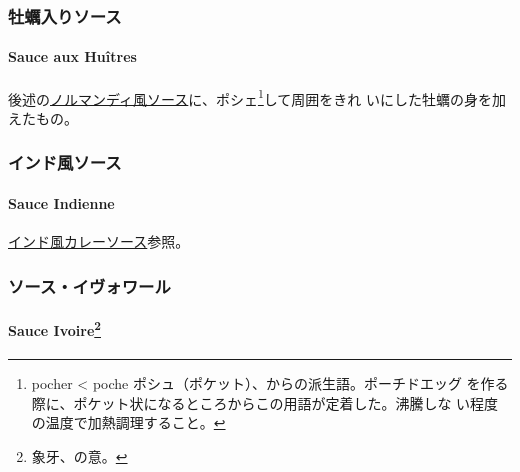 \begin{recette}
{\subsubsection{牡蠣入りソース}\label{ux7261ux8823ux5165ux308aux30bdux30fcux30b9}}

\hypertarget{sauce-aux-huitres}{%
\paragraph{Sauce aux Huîtres}\label{sauce-aux-huitres}}


後述の\protect\hyperlink{sauce-normande}{ノルマンディ風ソース}に、ポシェ\footnote{pocher
  \textless{} poche ポシュ（ポケット）、からの派生語。ポーチドエッグ
  を作る際に、ポケット状になるところからこの用語が定着した。沸騰しな
  い程度の温度で加熱調理すること。}して周囲をきれ
いにした牡蠣の身を加えたもの。

\maeaki

\hypertarget{ux30a4ux30f3ux30c9ux98a8ux30bdux30fcux30b9}{%
\subsubsection{インド風ソース}\label{ux30a4ux30f3ux30c9ux98a8ux30bdux30fcux30b9}}

\hypertarget{sauce-indienne}{%
\paragraph{Sauce Indienne}\label{sauce-indienne}}


\protect\hyperlink{sauce-currie-indienne}{インド風カレーソース}参照。

\maeaki

\hypertarget{ux30bdux30fcux30b9ux30a4ux30f4ux30a9ux30efux30fcux30eb}{%
\subsubsection{ソース・イヴォワール}\label{ux30bdux30fcux30b9ux30a4ux30f4ux30a9ux30efux30fcux30eb}}

\hypertarget{sauce-ivoire}{%
\paragraph[Sauce Ivoire]{\texorpdfstring{Sauce Ivoire\footnote{象牙、の意。}}{Sauce Ivoire}}\label{sauce-ivoire}}


\end{recette}
